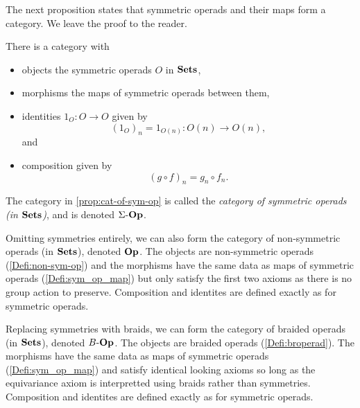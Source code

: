 The next proposition states that symmetric operads and their maps form a category. We leave the proof to the reader.

\begin{prop}\label{prop:cat-of-sym-op}
There is a category with 
\begin{itemize}
\item objects the symmetric operads $O$ in $\mathbf{Sets}$, 
\item morphisms the maps of symmetric operads between them,
\item identities $1_O \colon O \to O$ given by
\[
(1_O)_n = 1_{O(n)} \colon O(n) \to O(n),
\]
and
\item composition given by
\[
(g \circ f)_n = g_n \circ f_n.
\]
\end{itemize}
\end{prop}

\begin{nota}\label{nota:cat-of-sym-op}
The category in \cref{prop:cat-of-sym-op} is called the \emph{category of symmetric operads (in $\mathbf{Sets}$)}, and is denoted $\Sigma\mbox{-}\mathbf{Op}$.
\end{nota}

\begin{rem}\label{rem:cat-of-nonsym-op}
Omitting symmetries entirely, we can also form the category of non-symmetric operads (in $\mathbf{Sets}$), denoted $\mathbf{Op}$. The objects are non-symmetric operads (\cref{Defi:non-sym-op}) and the morphisms have the same data as maps of symmetric operads (\cref{Defi:sym_op_map}) but only satisfy the first two axioms as there is no group action to preserve. Composition and identites are defined exactly as for symmetric operads.
\end{rem}

\begin{rem}\label{rem:cat-of-br-op}
Replacing symmetries with braids, we can form the category of braided operads (in $\mathbf{Sets}$), denoted $B\mbox{-}\mathbf{Op}$. The objects are braided operads (\cref{Defi:broperad}). The morphisms have the same data as maps of symmetric operads (\cref{Defi:sym_op_map}) and satisfy identical looking axioms so long as the equivariance axiom is interpretted using braids rather than symmetries. Composition and identites are defined exactly as for symmetric operads.
\end{rem}


